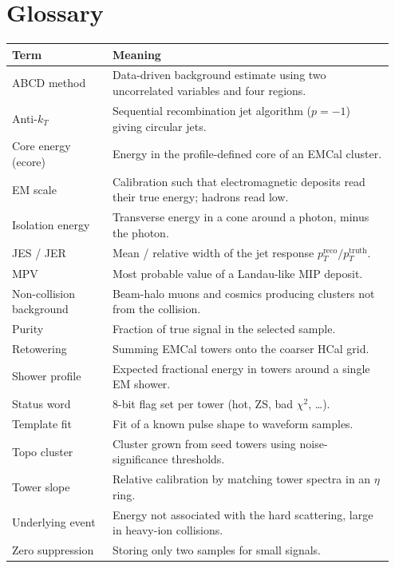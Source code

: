 \documentclass[11pt,letterpaper]{article}
\begin{document}
\section{Glossary}
\begin{longtable}{@{}p{0.25\linewidth}p{0.70\linewidth}@{}}\toprule
Term & Meaning \\\midrule\endhead
ABCD method & Data-driven background estimate using two uncorrelated variables and four regions. \\
Anti-$k_T$ & Sequential recombination jet algorithm ($p=-1$) giving circular jets. \\
Core energy (ecore) & Energy in the profile-defined core of an EMCal cluster. \\
EM scale & Calibration such that electromagnetic deposits read their true energy; hadrons read low. \\
Isolation energy & Transverse energy in a cone around a photon, minus the photon. \\
JES / JER & Mean / relative width of the jet response $p_T^{\mathrm{reco}}/p_T^{\mathrm{truth}}$. \\
MPV & Most probable value of a Landau-like MIP deposit. \\
Non-collision background & Beam-halo muons and cosmics producing clusters not from the collision. \\
Purity & Fraction of true signal in the selected sample. \\
Retowering & Summing EMCal towers onto the coarser HCal grid. \\
Shower profile & Expected fractional energy in towers around a single EM shower. \\
Status word & 8-bit flag set per tower (hot, ZS, bad $\chi^2$, \dots). \\
Template fit & Fit of a known pulse shape to waveform samples. \\
Topo cluster & Cluster grown from seed towers using noise-significance thresholds. \\
Tower slope & Relative calibration by matching tower spectra in an $\eta$ ring. \\
Underlying event & Energy not associated with the hard scattering, large in heavy-ion collisions. \\
Zero suppression & Storing only two samples for small signals. \\\bottomrule
\end{longtable}
\end{document}
